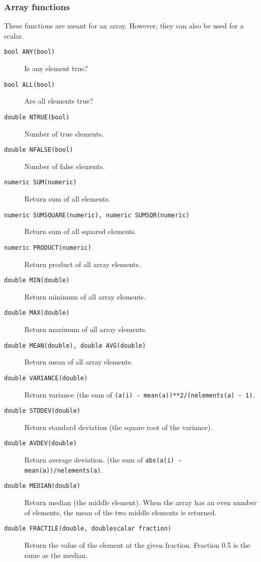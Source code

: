 \subsubsection{Array functions}
These functions are meant for an array.
However, they can also be used for a scalar.
\begin{description}
  \item[ \texttt{bool ANY(bool)}] Is any element true?
  \item[ \texttt{bool ALL(bool)}] Are all elements true?
  \item[ \texttt{double NTRUE(bool)}] Number of true elements.
  \item[ \texttt{double NFALSE(bool)}] Number of false elements.
  \item[ \texttt{numeric SUM(numeric)}] Return sum of all elements.
  \item[ \texttt{numeric SUMSQUARE(numeric), numeric SUMSQR(numeric)}]
       Return sum of all squared elements.
  \item[ \texttt{numeric PRODUCT(numeric)}] Return product
    of all array elements.
  \item[ \texttt{double MIN(double)}] Return minimum
    of all array elements.
  \item[ \texttt{double MAX(double)}] Return maximum
    of all array elements.
  \item[ \texttt{double MEAN(double), double AVG(double)}]
    Return mean of all array elements.
  \item[ \texttt{double VARIANCE(double)}] Return variance
    (the sum of \texttt{(a(i) - mean(a))**2/(nelements(a) - 1)}.
  \item[ \texttt{double STDDEV(double)}] Return standard
    deviation (the square root of the variance).
  \item[ \texttt{double AVDEV(double)}] Return average deviation.
    (the sum of \texttt{abs(a(i) - mean(a))/nelements(a)}.
  \item[ \texttt{double MEDIAN(double)}] Return median (the
    middle element).
    When the array has an even number of elements, the mean of
    the two middle elements is returned.
  \item[ \texttt{double FRACTILE(double, doublescalar fraction)}]
       Return the value of the element at the given fraction.
       Fraction 0.5 is the same as the median.
\end{description}


